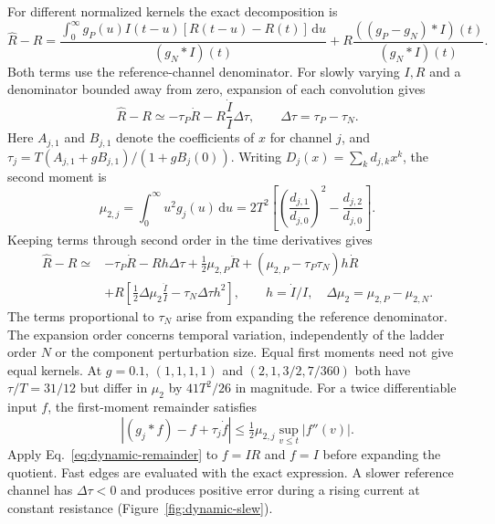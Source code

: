 For different normalized kernels the exact decomposition is
\begin{equation}\label{eq:dynamic-decomposition}
\hat R-R=\frac{\displaystyle\int_0^\infty g_P(u)I(t-u)[R(t-u)-R(t)]\,\mathrm du}{(g_N\ast I)(t)}
+R\frac{((g_P-g_N)\ast I)(t)}{(g_N\ast I)(t)}.
\end{equation}
Both terms use the reference-channel denominator. For slowly varying $I,R$ and a denominator bounded away from zero, expansion of each convolution gives
\begin{equation}\label{eq:mismatch-dynamic}
\hat R-R\simeq-\tau_P\dot R-R\frac{\dot I}{I}\Delta\tau,
\qquad \Delta\tau=\tau_P-\tau_N.
\end{equation}
Here $A_{j,1}$ and $B_{j,1}$ denote the coefficients of $x$ for channel $j$, and $\tau_j=T(A_{j,1}+gB_{j,1})/(1+gB_j(0))$. Writing $D_j(x)=\sum_k d_{j,k}x^k$, the second moment is
\begin{equation}\label{eq:second-moment}
\mu_{2,j}=\int_0^\infty u^2g_j(u)\,\mathrm du
=2T^2\left[\left(\frac{d_{j,1}}{d_{j,0}}\right)^2-\frac{d_{j,2}}{d_{j,0}}\right].
\end{equation}
Keeping terms through second order in the time derivatives gives
\begin{equation}\label{eq:second-order-ratio}
\begin{aligned}
\hat R-R\simeq{}&-\tau_P\dot R-Rh\Delta\tau+\tfrac12\mu_{2,P}\ddot R
+(\mu_{2,P}-\tau_P\tau_N)h\dot R\\
&+R\left[\tfrac12\Delta\mu_2\frac{\ddot I}{I}-\tau_N\Delta\tau h^2\right],
\qquad h=\dot I/I,\quad\Delta\mu_2=\mu_{2,P}-\mu_{2,N}.
\end{aligned}
\end{equation}
The terms proportional to $\tau_N$ arise from expanding the reference denominator. The expansion order concerns temporal variation, independently of the ladder order $N$ or the component perturbation size. Equal first moments need not give equal kernels. At $g=0.1$, $(1,1,1,1)$ and $(2,1,3/2,7/360)$ both have $\tau/T=31/12$ but differ in $\mu_2$ by $41T^2/26$ in magnitude. For a twice differentiable input $f$, the first-moment remainder satisfies
\begin{equation}\label{eq:dynamic-remainder}
|(g_j\ast f)-f+\tau_j\dot f|
\le\tfrac12\mu_{2,j}\sup_{v\le t}|f''(v)|.
\end{equation}
Apply Eq.~\eqref{eq:dynamic-remainder} to $f=IR$ and $f=I$ before expanding the quotient. Fast edges are evaluated with the exact expression. A slower reference channel has $\Delta\tau<0$ and produces positive error during a rising current at constant resistance (Figure~\ref{fig:dynamic-slew}).

